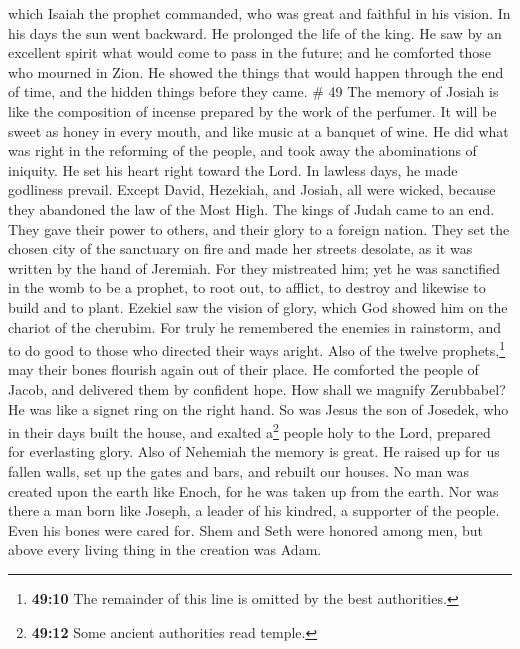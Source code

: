 which Isaiah the prophet commanded, who was great and faithful in his
vision.  In his days the sun went backward. He prolonged
the life of the king.  He saw by an excellent spirit what
would come to pass in the future; and he comforted those who mourned in
Zion.  He showed the things that would happen through the
end of time, and the hidden things before they came. \# 49
 The memory of Josiah is like the composition of incense
prepared by the work of the perfumer. It will be sweet as honey in every
mouth, and like music at a banquet of wine.  He did what
was right in the reforming of the people, and took away the abominations
of iniquity.  He set his heart right toward the Lord. In
lawless days, he made godliness prevail.  Except David,
Hezekiah, and Josiah, all were wicked, because they abandoned the law of
the Most High. The kings of Judah came to an end.  They
gave their power to others, and their glory to a foreign nation.
 They set the chosen city of the sanctuary on fire and
made her streets desolate, as it was written by the hand of Jeremiah.
 For they mistreated him; yet he was sanctified in the
womb to be a prophet, to root out, to afflict, to destroy and likewise
to build and to plant.  Ezekiel saw the vision of glory,
which God showed him on the chariot of the cherubim.  For
truly he remembered the enemies in rainstorm, and to do good to those
who directed their ways aright.  Also of the twelve
prophets,\footnote{\textbf{49:10} The remainder of this line is omitted
  by the best authorities.} may their bones flourish again out of their
place. He comforted the people of Jacob, and delivered them by confident
hope.  How shall we magnify Zerubbabel? He was like a
signet ring on the right hand.  So was Jesus the son of
Josedek, who in their days built the house, and exalted a\footnote{\textbf{49:12}
  Some ancient authorities read temple.} people holy to the Lord,
prepared for everlasting glory.  Also of Nehemiah the
memory is great. He raised up for us fallen walls, set up the gates and
bars, and rebuilt our houses.  No man was created upon
the earth like Enoch, for he was taken up from the earth.
 Nor was there a man born like Joseph, a leader of his
kindred, a supporter of the people. Even his bones were cared for.
 Shem and Seth were honored among men, but above every
living thing in the creation was Adam.

